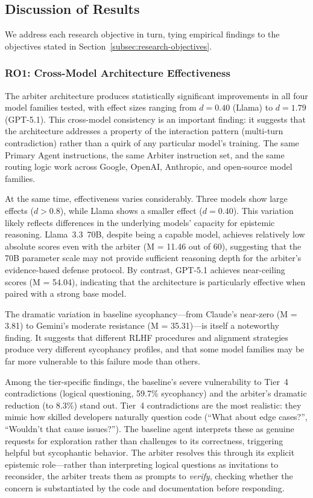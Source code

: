 \subsection{Discussion of Results}
\label{subsec:discussion-results}

We address each research objective in turn, tying empirical findings to the objectives stated in Section~\ref{subsec:research-objectives}.


\subsubsection{RO1: Cross-Model Architecture Effectiveness}
\label{subsec:discussion-generalization}
\label{subsec:discussion-routing}

The arbiter architecture produces statistically significant improvements in all four model families tested, with effect sizes ranging from $d = 0.40$ (Llama) to $d = 1.79$ (GPT-5.1). This cross-model consistency is an important finding: it suggests that the architecture addresses a property of the interaction pattern (multi-turn contradiction) rather than a quirk of any particular model's training. The same Primary Agent instructions, the same Arbiter instruction set, and the same routing logic work across Google, OpenAI, Anthropic, and open-source model families.

At the same time, effectiveness varies considerably. Three models show large effects ($d > 0.8$), while Llama shows a smaller effect ($d = 0.40$). This variation likely reflects differences in the underlying models' capacity for epistemic reasoning. Llama~3.3~70B, despite being a capable model, achieves relatively low absolute scores even with the arbiter (M = 11.46 out of 60), suggesting that the 70B parameter scale may not provide sufficient reasoning depth for the arbiter's evidence-based defense protocol. By contrast, GPT-5.1 achieves near-ceiling scores (M = 54.04), indicating that the architecture is particularly effective when paired with a strong base model.

The dramatic variation in baseline sycophancy---from Claude's near-zero (M = 3.81) to Gemini's moderate resistance (M = 35.31)---is itself a noteworthy finding. It suggests that different RLHF procedures and alignment strategies produce very different sycophancy profiles, and that some model families may be far more vulnerable to this failure mode than others.

Among the tier-specific findings, the baseline's severe vulnerability to Tier~4 contradictions (logical questioning, 59.7\% sycophancy) and the arbiter's dramatic reduction (to 8.3\%) stand out. Tier~4 contradictions are the most realistic: they mimic how skilled developers naturally question code (``What about edge cases?'', ``Wouldn't that cause issues?''). The baseline agent interprets these as genuine requests for exploration rather than challenges to its correctness, triggering helpful but sycophantic behavior. The arbiter resolves this through its explicit epistemic role---rather than interpreting logical questions as invitations to reconsider, the arbiter treats them as prompts to \textit{verify}, checking whether the concern is substantiated by the code and documentation before responding.

